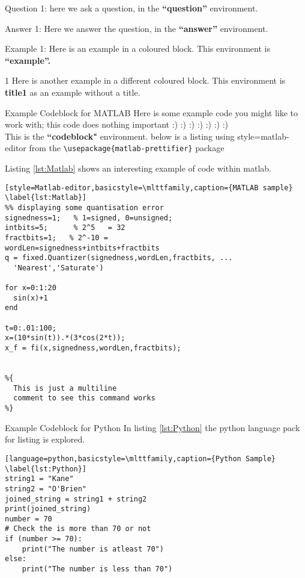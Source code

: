 \begin{question}{Question 1:}
  here we ask a question, in the \textbf{``question''} environment.
\end{question}

\begin{answer}{Answer 1:}
Here we answer the question, in the \textbf{``answer''} environment.
\end{answer}

\begin{example}{Example 1:}
Here is an example in a coloured block. This environment is \textbf{``example''.}
\end{example}

\begin{title1}{1}
Here is another example in a different coloured block. This environment is \textbf{title1} as an example without a title.
\end{title1}

\begin{codeblock}{Example Codeblock for MATLAB}
Here is some example code you might like to work with; this code does nothing important :) :) :) :) :) :) :)\\
This is the \textbf{``codeblock"} environment. below is a listing using style=matlab-editor from the \verb|\usepackage{matlab-prettifier}| package

Listing \ref{lst:Matlab} shows an interesting example of code within matlab.
\begin{lstlisting}[style=Matlab-editor,basicstyle=\mlttfamily,caption={MATLAB sample} \label{lst:Matlab}]
%% displaying some quantisation error
signedness=1;   % 1=signed, 0=unsigned;
intbits=5;      % 2^5   = 32
fractbits=1;   % 2^-10 =
wordLen=signedness+intbits+fractbits
q = fixed.Quantizer(signedness,wordLen,fractbits, ...
  'Nearest','Saturate')

for x=0:1:20
  sin(x)+1
end

t=0:.01:100;
x=(10*sin(t)).*(3*cos(2*t));
x_f = fi(x,signedness,wordLen,fractbits);


%{
  This is just a multiline
  comment to see this command works
%}
\end{lstlisting}
\end{codeblock}



\begin{codeblock}{Example Codeblock for Python}
In listing \ref{lst:Python} the python language pack for listing is explored.

\begin{lstlisting}[language=python,basicstyle=\mlttfamily,caption={Python Sample} \label{lst:Python}]
string1 = "Kane"
string2 = "O'Brien"
joined_string = string1 + string2
print(joined_string)
number = 70
# Check the is more than 70 or not
if (number >= 70):
    print("The number is atleast 70")
else:
    print("The number is less than 70")
\end{lstlisting}
\end{codeblock}
\clearpage
